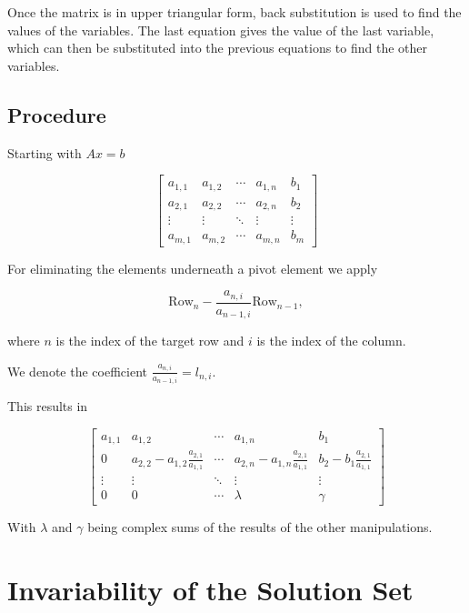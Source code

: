 Once the matrix is in upper triangular form, back substitution is used to find the values of the variables. The last equation gives the value of the last 
variable, which can then be substituted into the previous equations to find the other variables.

\subsection{Procedure}

Starting with \(Ax = b\)

\[  
    \left[
    \begin{array}{cccc|c}
        a_{1,1} &  a_{1,2} & \cdots & a_{1,n}  & b_1    \\
        a_{2,1} &  a_{2,2} & \cdots & a_{2,n}  & b_2    \\
        \vdots  &   \vdots & \ddots & \vdots   & \vdots \\
        a_{m,1} &  a_{m,2} & \cdots & a_{m,n}  & b_m
    \end{array}
    \right]
\]

For eliminating the elements underneath a pivot element we apply 

\[
    \text{Row}_n - \frac{a_{n, i}}{a_{n - 1, i}} \text{Row}_{n - 1},
\]

where \(n\) is the index of the target row and \(i\) is the index of the column.

We denote the coefficient \(\frac{a_{n, i}}{a_{n - 1, i}} = l_{n, i}\).

This results in

\[  
    \left[
    \begin{array}{cccc|c}
        a_{1,1} &  a_{1,2} & \cdots & a_{1,n}  & b_1    \\
        0 &  a_{2,2} - a_{1,2}\frac{a_{2,1}}{a_{1,1}} & \cdots & a_{2,n} - a_{1,n}\frac{a_{2,1}}{a_{1,1}}  & b_2 - b_1 \frac{a_{2,1}}{a_{1,1}}   \\
        \vdots  &   \vdots & \ddots & \vdots   & \vdots \\
        0 & 0  & \cdots & \lambda &  \gamma
    \end{array}
    \right]
\]

With \(\lambda\) and \(\gamma\) being complex sums of the results of the other manipulations.

\section{Invariability of the Solution Set}

